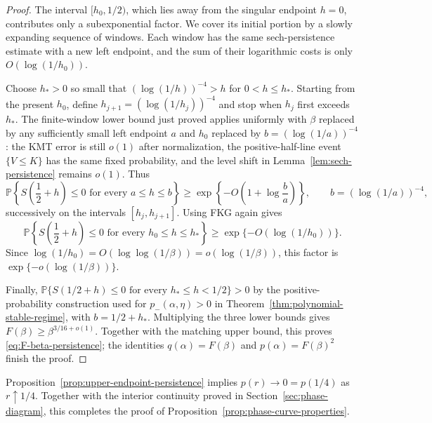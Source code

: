 \begin{proof}
The interval \([h_0,1/2)\), which lies away from the singular endpoint
\(h=0\), contributes only a subexponential factor. We cover its
initial portion by a slowly expanding sequence of windows. Each window has
the same sech-persistence estimate with a new left endpoint, and the sum of
their logarithmic costs is only $O(\log(1/h_0))$.

Choose \(h_*>0\) so small that
\((\log(1/h))^{-4}>h\) for \(0<h\le h_*\). Starting from the present \(h_0\),
define \(h_{j+1}=(\log(1/h_j))^{-4}\) and stop when \(h_j\) first exceeds
\(h_*\). The finite-window lower bound just proved applies uniformly with
\(\beta\) replaced by any sufficiently small left endpoint \(a\) and \(h_0\)
replaced by \(b=(\log(1/a))^{-4}\): the KMT error is still \(o(1)\) after
normalization, the positive-half-line event \(\{V\le K\}\) has the same fixed
probability, and the level shift in
Lemma~\ref{lem:sech-persistence} remains \(o(1)\). Thus
\[
    \mathbb P\left\{
        S\left(\frac12+h\right)\le0
        \text{ for every }a\le h\le b
    \right\}
    \ge
    \exp\!\left\{-O\!\left(1+\log\frac ba\right)\right\},
    \qquad b=(\log(1/a))^{-4},
\]
successively on the intervals $[h_j,h_{j+1}]$. Using FKG again gives
\[
    \mathbb P\left\{
        S\left(\frac12+h\right)\le0
        \text{ for every }h_0\le h\le h_*
    \right\}
    \ge
    \exp\{-O(\log(1/h_0))\}.
\]
Since $\log(1/h_0)=O(\log\log(1/\beta))=o(\log(1/\beta))$, this factor is $\exp\{-o(\log(1/\beta))\}$.

Finally,
$\mathbb P\{S(1/2+h)\le0\text{ for every }h_*\le h<1/2\}>0$ by the
positive-probability construction used for $p_-(\alpha,\eta)>0$ in
Theorem~\ref{thm:polynomial-stable-regime}, with $b=1/2+h_*$. Multiplying
the three lower bounds gives $F(\beta)\ge\beta^{3/16+o(1)}$. Together with
the matching upper bound, this proves \eqref{eq:F-beta-persistence}; the
identities $q(\alpha)=F(\beta)$ and $p(\alpha)=F(\beta)^2$ finish the proof.
\end{proof}

Proposition~\ref{prop:upper-endpoint-persistence} implies
\(p(r)\to0=p(1/4)\) as \(r\uparrow1/4\). Together with the interior
continuity proved in Section~\ref{sec:phase-diagram}, this completes the proof
of Proposition~\ref{prop:phase-curve-properties}.

